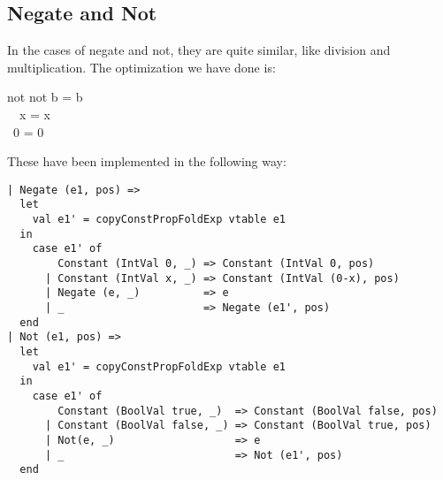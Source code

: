 \documentclass[12pt]{article}
\begin{document}
\subsection{Negate and Not}
In the cases of negate and not, they are quite similar, like division and multiplication. The optimization we have done is:\\
\begin{center}
not not b = b\\
~~x = x \\
~0 = 0
\end{center}
These have been implemented in the following way:
\begin{verbatim}
| Negate (e1, pos) =>
  let
    val e1' = copyConstPropFoldExp vtable e1
  in
    case e1' of
        Constant (IntVal 0, _) => Constant (IntVal 0, pos)
      | Constant (IntVal x, _) => Constant (IntVal (0-x), pos)
      | Negate (e, _)          => e
      | _                      => Negate (e1', pos)
  end 
| Not (e1, pos) =>
  let
    val e1' = copyConstPropFoldExp vtable e1
  in
    case e1' of
        Constant (BoolVal true, _)  => Constant (BoolVal false, pos)
      | Constant (BoolVal false, _) => Constant (BoolVal true, pos) 
      | Not(e, _)                   => e
      | _                           => Not (e1', pos)
  end 
\end{verbatim}
\end{document}
